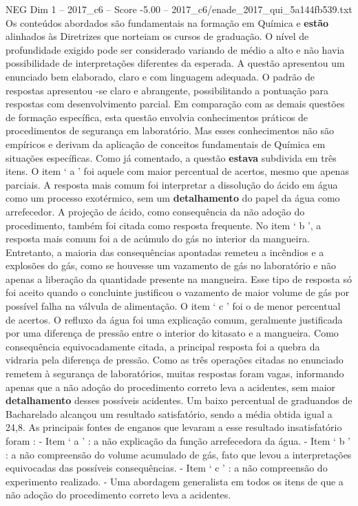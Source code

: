 \begin{textsample}{NEG Dim 1 – 2017\_c6 – Score -5.00 – 2017\_c6/enade\_2017\_qui\_5a144fb539.txt}
Os conteúdos abordados são fundamentais na formação em Química e \textbf{estão} alinhados às Diretrizes que norteiam os cursos de graduação.
O nível de profundidade exigido pode ser considerado variando de médio a alto e não havia possibilidade de interpretações diferentes da esperada.
A questão apresentou um enunciado bem elaborado, claro e com linguagem adequada.
O padrão de respostas apresentou -se claro e abrangente, possibilitando a pontuação para respostas com desenvolvimento parcial.
Em comparação com as demais questões de formação específica, esta questão envolvia conhecimentos práticos de procedimentos de segurança em laboratório.
Mas esses conhecimentos não são empíricos e derivam da aplicação de conceitos fundamentais de Química em situações específicas.
Como já comentado, a questão \textbf{estava} subdivida em três itens.
O item ‘ a ’ foi aquele com maior percentual de acertos, mesmo que apenas parciais.
A resposta mais comum foi interpretar a dissolução do ácido em água como um processo exotérmico, sem um \textbf{detalhamento} do papel da água como arrefecedor.
A projeção de ácido, como consequência da não adoção do procedimento, também foi citada como resposta frequente.
No item ‘ b ’, a resposta mais comum foi a de acúmulo do gás no interior da mangueira.
Entretanto, a maioria das consequências apontadas remeteu a incêndios e a explosões do gás, como se houvesse um vazamento de gás no laboratório e não apenas a liberação da quantidade presente na mangueira.
Esse tipo de resposta só foi aceito quando o concluinte justificou o vazamento de maior volume de gás por possível falha na válvula de alimentação.
O item ‘ c ’ foi o de menor percentual de acertos.
O refluxo da água foi uma explicação comum, geralmente justificada por uma diferença de pressão entre o interior do kitasato e a mangueira.
Como consequência equivocadamente citada, a principal resposta foi a quebra da vidraria pela diferença de pressão.
Como as três operações citadas no enunciado remetem à segurança de laboratórios, muitas respostas foram vagas, informando apenas que a não adoção do procedimento correto leva a acidentes, sem maior \textbf{detalhamento} desses possíveis acidentes.
Um baixo percentual de graduandos de Bacharelado alcançou um resultado satisfatório, sendo a média obtida igual a 24,8.
As principais fontes de enganos que levaram a esse resultado insatisfatório foram : - Item ‘ a ’ : a não explicação da função arrefecedora da água. - Item ‘ b ’ : a não compreensão do volume acumulado de gás, fato que levou a interpretações equivocadas das possíveis consequências. - Item ‘ c ’ : a não compreensão do experimento realizado. - Uma abordagem generalista em todos os itens de que a não adoção do procedimento correto leva a acidentes.

\end{textsample}
